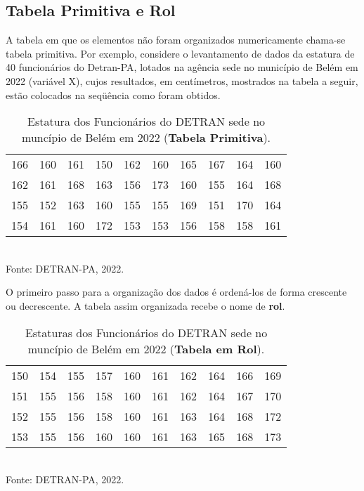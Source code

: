 \subsection{Tabela Primitiva e Rol}


\inic A tabela em que os elementos não foram organizados numericamente chama-se tabela primitiva. Por exemplo, considere o levantamento de dados da estatura de 40 funcionários do Detran-PA, lotados na agência sede no município de Belém em 2022 (variável X), cujos resultados, em centímetros, mostrados na tabela a seguir, estão colocados na seqüência como foram obtidos.


\begin{table}[!htb]
    \centering
    {
    \caption{Estatura dos Funcionários do DETRAN sede no muncípio de Belém em 2022 (\textbf{Tabela Primitiva}).}
    \label{estatura}
    \vspace{0.2cm}
\begin{tabular}{c|c|c|c|c|c|c|c|c|c}
  \hline\hline
  166 & 160 & 161 & 150 & 162 & 160 & 165 & 167 & 164 & 160 \\
  162 & 161 & 168 & 163 & 156 & 173 & 160 & 155 & 164 & 168 \\
  155 & 152 & 163 & 160 & 155 & 155 & 169 & 151 & 170 & 164 \\
  154 & 161 & 160 & 172 & 153 & 153 & 156 & 158 & 158 & 161 \\
  \hline\hline
\end{tabular}}
\\
\hspace{-5.5cm} Fonte: DETRAN-PA, 2022.
\end{table}

\newpage

O primeiro passo para a organização dos dados é ordená-los de forma crescente ou decrescente. A tabela assim organizada recebe o nome de \textbf{rol}.


\begin{table}[!htb]
    \centering
    {
    \caption{Estaturas dos Funcionários do DETRAN sede no muncípio de Belém em 2022 (\textbf{Tabela em Rol}).}
    \label{estatura2}
    \vspace{0.2cm}
\begin{tabular}{c|c|c|c|c|c|c|c|c|c}
  \hline\hline
  150 & 154 & 155 & 157 & 160 & 161 & 162 & 164 & 166 & 169 \\
  151 & 155 & 156 & 158 & 160 & 161 & 162 & 164 & 167 & 170 \\
  152 & 155 & 156 & 158 & 160 & 161 & 163 & 164 & 168 & 172 \\
  153 & 155 & 156 & 160 & 160 & 161 & 163 & 165 & 168 & 173 \\
  \hline\hline
\end{tabular}}
\\
\hspace{-5.4cm} Fonte: DETRAN-PA, 2022.
\end{table}



